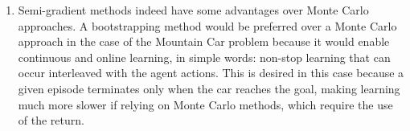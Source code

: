 \documentclass{article}
\newcommand\numberthis{\addtocounter{equation}{1}\tag{\theequation}}
\begin{document}
\begin{enumerate}
\begin{align*}
			      \mathbf{w})
		      - \hat{v}(s_t, \mathbf{w}))\right]^2 \nabla \hat{v}(s_t, \mathbf{w})                \\
		                       & = \mathbf{w}_t + \alpha \delta_t \nabla \hat{v}(s_t,
		      \mathbf{w}). \numberthis
	      \end{align*}
	      This is precisely the same result as Semi-Gradient TD(0). We note that semi-gradient methods no
	      longer make use of information from the true target value, $v_\pi$, instead only accounting
	      for changes on the estimates. In this sense, only a portion of the true gradient is
	      considered, hence the name ``semi-gradient''.
	\item Semi-gradient methods indeed have some advantages over Monte Carlo approaches.
	      A bootstrapping method would be preferred over a Monte Carlo approach in the case of the
	      Mountain Car problem because it would enable continuous and online learning, in simple
	      words: non-stop learning that can occur interleaved with the agent actions. This is desired
	      in this case because a given episode terminates only when the car reaches the goal, making
	      learning much more slower if relying on Monte Carlo methods, which require the use of the
	      return.
\end{enumerate}
\end{document}
